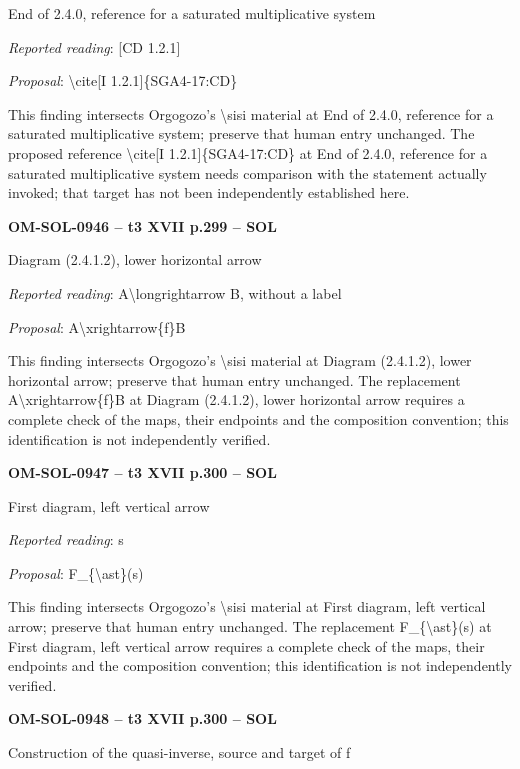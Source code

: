 End of 2.4.0, reference for a saturated multiplicative system\par
\emph{Reported reading}: [CD 1.2.1]\par
\emph{Proposal}: \textbackslash{}cite[I 1.2.1]\{SGA4-17:CD\}\par
This finding intersects Orgogozo's \textbackslash{}sisi material at End of 2.4.0, reference for a saturated multiplicative system; preserve that human entry unchanged. The proposed reference \textbackslash{}cite[I 1.2.1]\{SGA4-17:CD\} at End of 2.4.0, reference for a saturated multiplicative system needs comparison with the statement actually invoked; that target has not been independently established here.\par
\par\noindent\textbf{OM-SOL-0946 -- t3 XVII p.299 -- SOL}\par
Diagram (2.4.1.2), lower horizontal arrow\par
\emph{Reported reading}: A\textbackslash{}longrightarrow B, without a label\par
\emph{Proposal}: A\textbackslash{}xrightarrow\{f\}B\par
This finding intersects Orgogozo's \textbackslash{}sisi material at Diagram (2.4.1.2), lower horizontal arrow; preserve that human entry unchanged. The replacement A\textbackslash{}xrightarrow\{f\}B at Diagram (2.4.1.2), lower horizontal arrow requires a complete check of the maps, their endpoints and the composition convention; this identification is not independently verified.\par
\par\noindent\textbf{OM-SOL-0947 -- t3 XVII p.300 -- SOL}\par
First diagram, left vertical arrow\par
\emph{Reported reading}: s\par
\emph{Proposal}: F\_\{\textbackslash{}ast\}(s)\par
This finding intersects Orgogozo's \textbackslash{}sisi material at First diagram, left vertical arrow; preserve that human entry unchanged. The replacement F\_\{\textbackslash{}ast\}(s) at First diagram, left vertical arrow requires a complete check of the maps, their endpoints and the composition convention; this identification is not independently verified.\par
\par\noindent\textbf{OM-SOL-0948 -- t3 XVII p.300 -- SOL}\par
Construction of the quasi-inverse, source and target of f\par
